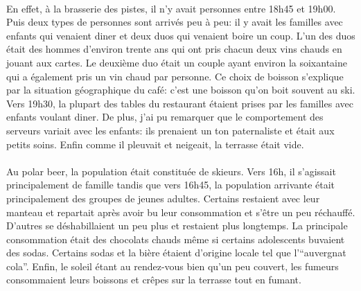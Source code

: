 \paragraph{} En effet, à la brasserie des pistes, il n'y avait personnes entre
18h45 et 19h00. Puis deux types de personnes sont arrivés peu à peu: il y avait
les familles avec enfants qui venaient diner et deux duos qui venaient boire un
coup. L'un des duos était des hommes d'environ trente ans qui ont pris chacun
deux vins chauds en jouant aux cartes. Le deuxième duo était un couple ayant
environ la soixantaine qui a également pris un vin chaud par personne. Ce choix
de boisson s'explique par la situation géographique du café: c'est une boisson
qu'on boit souvent au ski. Vers 19h30, la plupart des tables du restaurant
étaient prises par les familles avec enfants voulant diner. De plus, j'ai pu
remarquer que le comportement des serveurs variait avec les enfants: ils
prenaient un ton paternaliste et était aux petits soins. Enfin comme il
pleuvait et neigeait, la terrasse était vide.

\paragraph{} Au polar beer, la population était constituée de skieurs. Vers
16h, il s'agissait principalement de famille tandis que vers 16h45, la
population arrivante était principalement des groupes de jeunes adultes.
Certains restaient avec leur manteau et repartait après avoir bu leur
consommation et s'être un peu réchauffé. D'autres se déshabillaient un peu plus
et restaient plus longtemps. La principale consommation était des chocolats
chauds même si certains adolescents buvaient des sodas.  Certains sodas et la
bière étaient d'origine locale tel que l'``auvergnat cola''. Enfin, le soleil
étant au rendez-vous bien qu'un peu couvert, les fumeurs consommaient leurs
boissons et crêpes sur la terrasse tout en fumant.

